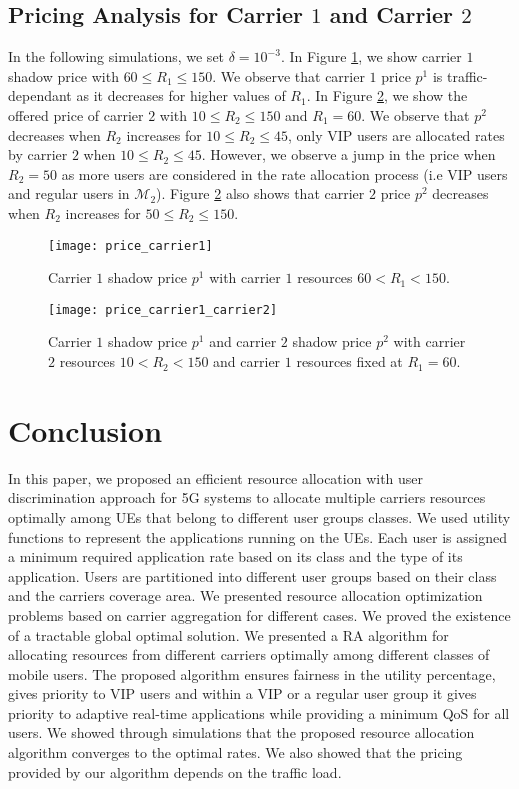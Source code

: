 \documentclass[journal]{IEEEtran} 				\IEEEoverridecommandlockouts 						\usepackage{amsmath,amssymb}
\begin{document}
\subsection{Pricing Analysis for Carrier $1$ and Carrier $2$}
In the following simulations, we set $\delta =10^{-3}$. In Figure \ref{fig:price_carrier1}, we show carrier $1$ shadow price with $60\leq R_1 \leq 150$. We observe that carrier $1$ price $p^1$ is traffic-dependant as it decreases for higher values of $R_1$. In Figure \ref{fig:price_carrier1_carrier2}, we show the offered price of carrier $2$ with $10\leq R_2 \leq 150$ and $R_1=60$. We observe that $p^2$ decreases when $R_2$ increases for $10\le R_2 \le 45$, only VIP users are allocated rates by carrier $2$ when $10\le R_2 \le 45$. However, we observe a jump in the price when $R_2=50$ as more users are considered in the rate allocation process (i.e VIP users and regular users in $\mathcal{M}_2$). Figure \ref{fig:price_carrier1_carrier2} also shows that carrier $2$ price $p^2$ decreases when $R_2$ increases for $50\le R_2 \le 150$.
\begin{figure}
\centering
\texttt{[image: price\_carrier1]}
\caption{Carrier $1$ shadow price $p^1$ with carrier $1$ resources $60<R_1<150$.}
\label{fig:price_carrier1}
\end{figure}

\begin{figure}[tb]
\centering
\texttt{[image: price\_carrier1\_carrier2]}
\caption{Carrier $1$ shadow price $p^1$ and carrier $2$ shadow price $p^2$ with carrier $2$ resources $10<R_2<150$ and carrier $1$ resources fixed at $R_1=60$.}
\label{fig:price_carrier1_carrier2}
\end{figure}
\section{Conclusion}\label{sec:conclude}
In this paper, we proposed an efficient resource allocation with user discrimination approach for 5G systems to allocate multiple carriers resources optimally among UEs that belong to different user groups classes. We used utility functions to represent the applications running on the UEs. Each user is assigned a minimum required application rate based on its class and the type of its application. Users are partitioned into different user groups based on their class and the carriers coverage area. We presented resource allocation optimization problems based on carrier aggregation for different cases. We proved the existence of a tractable global optimal solution. We presented a RA algorithm for allocating resources from different carriers optimally among different classes of mobile users. The proposed algorithm ensures fairness in the utility percentage, gives priority to VIP users and within a VIP or a regular user group it gives priority to adaptive real-time applications while providing a minimum QoS for all users. We showed through simulations that the proposed resource allocation algorithm converges to the optimal rates. We also showed that the pricing provided by our algorithm depends on the traffic load.



\end{document}
